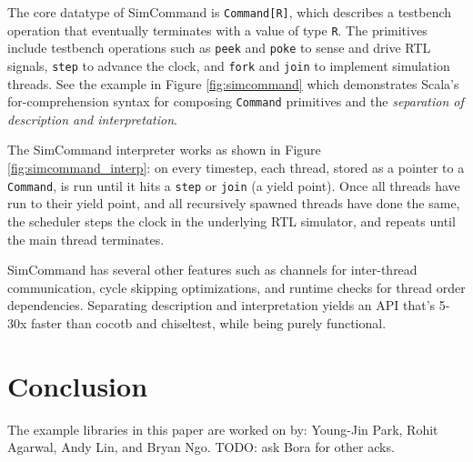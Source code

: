 \documentclass[sigplan,review,nonacm,9pt]{acmart}
\begin{document}
The core datatype of SimCommand is \texttt{Command[R]}, which describes a testbench operation that eventually terminates with a value of type \texttt{R}.
The primitives include testbench operations such as \texttt{peek} and \texttt{poke} to sense and drive RTL signals, \texttt{step} to advance the clock, and \texttt{fork} and \texttt{join} to implement simulation threads.
See the example in Figure \ref{fig:simcommand} which demonstrates Scala's for-comprehension syntax for composing \texttt{Command} primitives and the \textit{separation of description and interpretation}.

The SimCommand interpreter works as shown in Figure \ref{fig:simcommand_interp}: on every timestep, each thread, stored as a pointer to a \texttt{Command}, is run until it hits a \texttt{step} or \texttt{join} (a yield point).
Once all threads have run to their yield point, and all recursively spawned threads have done the same, the scheduler steps the clock in the underlying RTL simulator, and repeats until the main thread terminates.

SimCommand has several other features such as channels for inter-thread communication, cycle skipping optimizations, and runtime checks for thread order dependencies.
Separating description and interpretation yields an API that's 5-30x faster than cocotb and chiseltest, while being purely functional.



\section{Conclusion}

\begin{acks}
The example libraries in this paper are worked on by: Young-Jin Park, Rohit Agarwal, Andy Lin, and Bryan Ngo.
TODO: ask Bora for other acks.
\end{acks}




\end{document}
